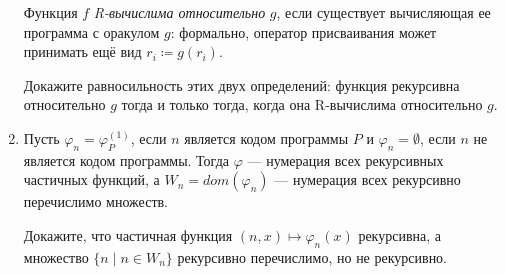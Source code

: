 \documentclass[a4paper,11pt]{article}
\begin{document}
\begin{enumerate}
Функция $f$ {\it R-вычислима относительно} $g$, если существует вычисляющая ее программа с оракулом $g$: формально, оператор присваивания может принимать ещё вид \(r_i \coloneqq g(r_i)\).

Докажите равносильность этих двух определений: функция рекурсивна относительно \(g\) тогда и только тогда, когда она R-вычислима относительно \(g\).

	\item Пусть $\varphi_n=\varphi^{(1)}_P$, если $n$ является кодом программы $P$ и $\varphi_n=\emptyset$, если $n$ не является кодом программы. Тогда $\varphi$ --- нумерация всех рекурсивных частичных функций, а $W_n=dom(\varphi_n)$ --- нумерация всех рекурсивно перечислимо множеств.

Докажите, что частичная функция $(n,x)\mapsto\varphi_n(x)$ рекурсивна, а множество $\{n\mid n\in W_n\}$ рекурсивно перечислимо, но не рекурсивно.

\end{enumerate}
\end{document}
